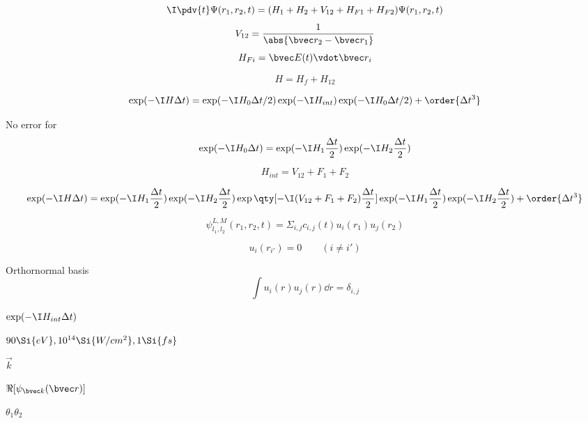 
\begin{equation}
\I \pdv{t}\Psi(r_1, r_2, t) = (H_1 + H_2 + V_{12} + H_{F1} + H_{F2})\Psi(r_1, r_2, t)
\end{equation}
\begin{equation}
V_{12} = \frac{1}{\abs{\bvec r_2 - \bvec r_1}}
\end{equation}
\begin{equation}
H_{Fi} = \bvec E(t) \vdot \bvec r_i
\end{equation}


\begin{equation}
H = H_f + H_{12}
\end{equation}

\begin{equation}
\exp(-\I H \Delta t) = \exp(-\I H_0 \Delta t/2) \exp(-\I H_{int}) \exp(-\I H_0 \Delta t/2) + \order{\Delta t^3}
\end{equation}

No error for
\begin{equation}
\exp(-\I H_0 \Delta t) = \exp(-\I H_{1} \frac{\Delta t}{2}) \exp(-\I H_2 \frac{\Delta t}{2})
\end{equation}

\begin{equation}
H_{int} = V_{12} + F_1 + F_2
\end{equation}

\begin{equation}
\exp(-\I H\Delta t) = \exp(-\I H_{1} \frac{\Delta t}{2}) \exp(-\I H_2 \frac{\Delta t}{2}) \exp\qty[-\I (V_{12} + F_1 + F_2) \frac{\Delta t}{2}] \exp(-\I H_{1} \frac{\Delta t}{2}) \exp(-\I H_{2} \frac{\Delta t}{2}) + \order{\Delta t^3}
\end{equation}

\begin{equation}
\psi_{l_1,l_2}^{L,M}(r_1, r_2, t) = \Sigma_{i,j} c_{i,j}(t) u_i(r_1) u_j(r_2)
\end{equation}

\begin{equation}
u_i(r_{i'}) = 0 \qquad (i \ne i')
\end{equation}

Orthornormal basis
\begin{equation}
\int u_i(r)u_j(r) \dd{r} = \delta_{i,j}
\end{equation}

$\exp(-\I H_{int}\Delta t)$

$90\Si{eV}, 10^{14} \Si{W/cm^2}, 1\Si{fs}$

$\vec k$

$\Re [\psi_{\bvec k}(\bvec r)]$

$\theta_1 \theta_2$